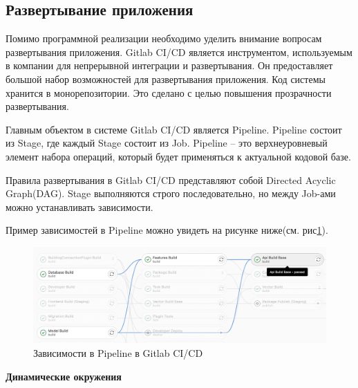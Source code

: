 \subsection{\large{Развертывание приложения}}

Помимо программной реализации необходимо уделить внимание вопросам развертывания приложения.
Gitlab CI/CD является инструментом, используемым в компании для непрерывной интеграции и развертывания.
Он предоставляет большой набор возможностей для развертывания приложения.
Код системы хранится в монорепозитории.
Это сделано с целью повышения прозрачности развертывания.

Главным объектом в системе Gitlab CI/CD является Pipeline.
Pipeline состоит из Stage, где каждый Stage состоит из Job.
Pipeline -- это верхнеуровневый элемент набора операций,
который будет применяться к актуальной кодовой базе.

Правила развертывания в Gitlab CI/CD представляют собой Directed Acyclic Graph(DAG).
Stage выполняются строго последовательно, но между Job-ами можно устанавливать зависимости.

Пример зависимостей в Pipeline можно увидеть на рисунке ниже(см. рис\ref{pic:implementation__deployment-dependencies}).
\begin{figure}[H]
	\includegraphics[width=\textwidth]{implementation/pictures/deployment/dependencies}
	\caption{Зависимости в Pipeline в Gitlab CI/CD}
	\label{pic:implementation__deployment-dependencies}
\end{figure}
\vskip 10mm

\noindent \textbf{Динамические окружения}

